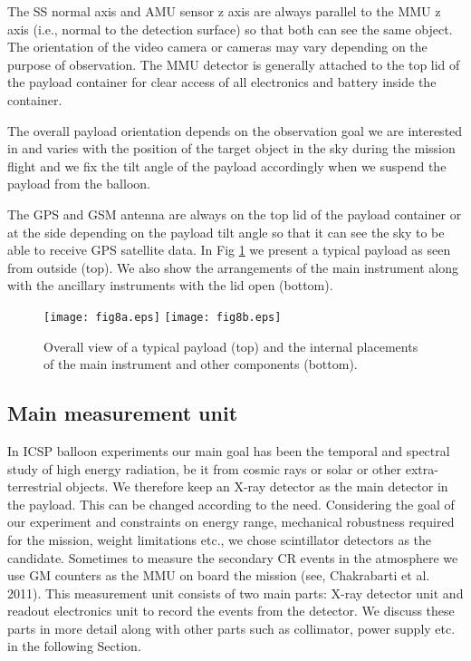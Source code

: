The SS normal axis and AMU sensor z axis are always parallel to the MMU z axis
(i.e., normal to the detection surface) so that both can see the same object.
The orientation of the video camera or cameras may vary 
depending on the purpose of observation.
The MMU detector is generally attached to the top lid of the payload container
for clear access of all electronics and battery inside the container. 

The overall payload orientation depends on the observation goal we are
interested in and varies with the position of the target object in the sky
during the mission flight and we fix the tilt angle of the payload accordingly
when we suspend the payload from the balloon.

The GPS and GSM antenna are always on the top lid of the payload container
or at the side depending on the payload tilt angle so that it can see the
sky to be able to receive GPS satellite data. In Fig \ref{fig:payload} 
we present a typical payload as seen from outside (top). We also show the arrangements 
of the main instrument along with the ancillary instruments with the lid open 
(bottom).

\begin{figure}[h]
  \centering
  \texttt{[image: fig8a.eps]}
  \texttt{[image: fig8b.eps]}
  \caption{Overall view of a typical payload (top) and the 
internal placements of the main instrument and other components (bottom).}
   \label{fig:payload}
\end{figure}

\subsection{Main measurement unit}
\label{ssec:mmu}
In ICSP balloon experiments our main goal has been the temporal and spectral study of high energy
radiation, be it from cosmic rays or solar or other extra-terrestrial objects. We therefore keep an 
X-ray detector as the main detector in the payload. This can be changed according to the need. Considering
the goal of our experiment and constraints on energy range, mechanical
robustness required for the mission, weight limitations etc., we chose
scintillator detectors as the candidate. Sometimes to measure the secondary CR
events in the atmosphere we use GM counters as the MMU on board the mission (see, 
Chakrabarti et al. 2011). This measurement unit consists of two main
parts: X-ray detector unit and readout electronics unit to record the events 
from the detector. We discuss these
parts in more detail along with other parts such as collimator, power supply etc.
in the following Section.

